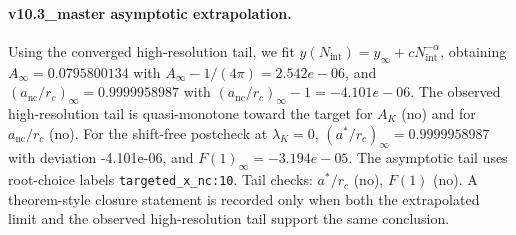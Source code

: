 \paragraph{v10.3_master asymptotic extrapolation.}
Using the converged high-resolution tail, we fit $y(N_{\mathrm{int}})=y_{\infty}+cN_{\mathrm{int}}^{-\alpha}$, obtaining $A_\infty=0.0795800134$ with $A_\infty-1/(4\pi)=2.542e-06$, and $(a_{\mathrm{nc}}/r_c)_\infty=0.9999958987$ with $(a_{\mathrm{nc}}/r_c)_\infty-1=-4.101e-06$. The observed high-resolution tail is quasi-monotone toward the target for $A_K$ (no) and for $a_{\mathrm{nc}}/r_c$ (no). For the shift-free postcheck at $\lambda_K=0$, $(a^*/r_c)_\infty=0.9999958987$ with deviation -4.101e-06, and $F(1)_\infty=-3.194e-05$. The asymptotic tail uses root-choice labels \texttt{targeted_x_nc:10}. Tail checks: $a^*/r_c$ (no), $F(1)$ (no). A theorem-style closure statement is recorded only when both the extrapolated limit and the
observed high-resolution tail support the same conclusion.
